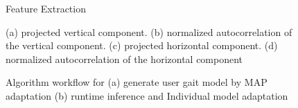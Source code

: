\documentclass{sig-alternate}
\begin{document}
\begin{figure}
\centering
{}
\caption{Feature Extraction}
\label{fig:SecondStep}
\end{figure}

\begin{figure}
\centering
{}
\caption{(a) projected vertical component. (b) normalized autocorrelation of the vertical component. (c) projected horizontal component. (d) normalized autocorrelation of the horizontal component}
\label{fig:TD1}
\end{figure}

\begin{figure}
\centering
{}
\caption{Algorithm workflow for (a) generate user gait model by MAP adaptation (b) runtime inference and Individual model adaptation}
\label{fig:TD2}
\end{figure}
\end{document}
